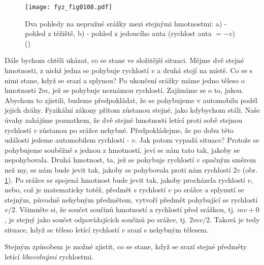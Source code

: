     \begin{figure}[ht!]  %
      \centering
      \texttt{[image: fyz\_fig0108.pdf]}
      \caption{Dva pohledy na nepružné srážky mezi stejnými hmotnostmi: a) - pohled z těžiště, b) 
               -  pohled z jedoucího auta (rychlost auta \(= -v\))
              (\cite[s.~145]{Feynman01})}
      \label{fyz:fig0108}
    \end{figure}
    Dále bychom chtěli ukázat, co se stane ve složitější situaci. Mějme dvě stejné hmotnosti, z 
    nichž jedna se pohybuje rychlostí \(v\) a druhá stojí na místě. Co se s nimi stane, když se 
    srazí a splynou? Po ukončení srážky máme jedno těleso o hmotnosti \(2m\), jež se pohybuje 
    neznámou rychlostí. Zajímáme se o to, jakou. Abychom to zjistili, budeme předpokládat, že se 
    pohybujeme v automobilu podél jejich dráhy. Fyzikální zákony přitom zůstanou stejné, jako 
    kdybychom stáli. Naše úvahy zahájíme poznatkem, že dvě stejné hmotnosti letící proti sobě 
    stejnou rychlostí \(v\) zůstanou po srážce nehybné. Předpokládejme, že po dobu této události 
    jedeme automobilem rychlostí - \(v\). Jak potom vypadá situace? Protože se pohybujeme souběžně 
    s jednou z hmotností, jeví se nám tato tak, jakoby se nepohybovala. Druhá hmotnost, ta, jež se 
    pohybuje rychlostí \(v\) opačným směrem než my, se nám bude jevit tak, jakoby se pohybovala 
    proti nám rychlostí \(2v\) (obr. \ref{fyz:fig0108}). Po srážce se spojená hmotnost bude jevit 
    tak, jakoby procházela rychlostí \(v\), nebo, což je matematicky totéž, předmět s rychlostí 
    \(v\) po srážce a splynutí se stejným, původně nehybným předmětem, vytvoří předmět pohybující 
    se rychlostí \(v/2\). Všimněte si, že součet součinů hmotností a rychlostí před srážkou, tj. 
    \(mv + 0\), je stejný jako součet odpovídajících součinů po srážce, tj. \(2mv/2\). Taková je 
    tedy situace, když se těleso letící rychlostí \(v\) srazí s nehybným tělesem.

    Stejným způsobem je možné zjistit, co se stane, když se srazí stejné předměty letící 
    \emph{libovolnými} rychlostmi.

